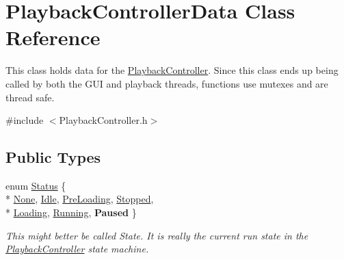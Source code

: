 \hypertarget{class_playback_controller_data}{\section{Playback\-Controller\-Data Class Reference}
\label{class_playback_controller_data}
}


This class holds data for the \hyperlink{class_playback_controller}{Playback\-Controller}. Since this class ends up being called by both the G\-U\-I and playback threads, functions use mutexes and are thread safe.  




{\ttfamily \#include $<$Playback\-Controller.\-h$>$}

\subsection*{Public Types}
\begin{DoxyCompactItemize}
\item 
enum \hyperlink{class_playback_controller_data_a64757fd28c6f9ab34d438f6c778eaf90}{Status} \{ \\*
\hyperlink{class_playback_controller_data_a64757fd28c6f9ab34d438f6c778eaf90a9e01f0b9a93d4e40923c56be203ff30f}{None}, 
\hyperlink{class_playback_controller_data_a64757fd28c6f9ab34d438f6c778eaf90a6b3585240b6c4938ea3c6e75a1bd8a90}{Idle}, 
\hyperlink{class_playback_controller_data_a64757fd28c6f9ab34d438f6c778eaf90a9a2723aa72971e727b7868217dc8a7c2}{Pre\-Loading}, 
\hyperlink{class_playback_controller_data_a64757fd28c6f9ab34d438f6c778eaf90ad7265c9975ca6dd4aa17b9004a9f3f9f}{Stopped}, 
\\*
\hyperlink{class_playback_controller_data_a64757fd28c6f9ab34d438f6c778eaf90a4992089309400a3ddb26896e13fbd022}{Loading}, 
\hyperlink{class_playback_controller_data_a64757fd28c6f9ab34d438f6c778eaf90aaf128c5cf5b65d84d7263557dc32b5db}{Running}, 
{\bfseries Paused}
 \}
\begin{DoxyCompactList}\small\item\em This might better be called State. It is really the current run state in the \hyperlink{class_playback_controller}{Playback\-Controller} state machine. \end{DoxyCompactList}\end{DoxyCompactItemize}
